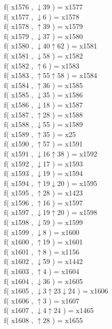 f( x1576 , $\downarrow$39 ) = x1577 \\
f( x1577 , $\downarrow$6 ) = x1578 \\
f( x1578 , $\uparrow$39 ) = x1579 \\
f( x1579 , $\downarrow$37 ) = x1580 \\
f( x1580 , $\downarrow$40$\uparrow$62 ) = x1581 \\
f( x1581 , $\downarrow$58 ) = x1582 \\
f( x1582 , $\uparrow$6 ) = x1583 \\
f( x1583 , $\uparrow$55$\uparrow$58 ) = x1584 \\
f( x1584 , $\uparrow$36 ) = x1585 \\
f( x1585 , $\downarrow$35 ) = x1586 \\
f( x1586 , $\downarrow$18 ) = x1587 \\
f( x1587 , $\uparrow$28 ) = x1588 \\
f( x1588 , $\downarrow$55 ) = x1589 \\
f( x1589 , $\uparrow$35 ) = x25 \\
f( x1590 , $\uparrow$57 ) = x1591 \\
f( x1591 , $\downarrow$16$\uparrow$38 ) = x1592 \\
f( x1592 , $\downarrow$17 ) = x1593 \\
f( x1593 , $\downarrow$19 ) = x1594 \\
f( x1594 , $\uparrow$19$\downarrow$20 ) = x1595 \\
f( x1595 , $\uparrow$28 ) = x1423 \\
f( x1596 , $\uparrow$16 ) = x1597 \\
f( x1597 , $\downarrow$19$\uparrow$20 ) = x1598 \\
f( x1598 , $\downarrow$59 ) = x1599 \\
f( x1599 , $\downarrow$8 ) = x1600 \\
f( x1600 , $\uparrow$19 ) = x1601 \\
f( x1601 , $\uparrow$8 ) = x1156 \\
f( x1602 , $\downarrow$59 ) = x1442 \\
f( x1603 , $\uparrow$4 ) = x1604 \\
f( x1604 , $\downarrow$36 ) = x1605 \\
f( x1605 , $\downarrow$3$\uparrow$23$\downarrow$24 ) = x1606 \\
f( x1606 , $\uparrow$3 ) = x1607 \\
f( x1607 , $\downarrow$4$\uparrow$24 ) = x1465 \\
f( x1608 , $\uparrow$28 ) = x1655 \\
